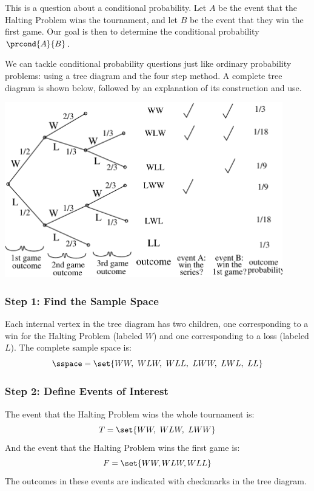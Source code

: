 This is a question about a conditional probability.  Let $A$ be the
event that the Halting Problem wins the tournament, and let $B$ be the
event that they win the first game.  Our goal is then to determine the
conditional probability $\prcond{A}{B}$.

We can tackle conditional probability questions just like ordinary
probability problems: using a tree diagram and the four step method.
A complete tree diagram is shown below, followed by an explanation of
its construction and use.
%
\begin{center}
\includegraphics[height=3in]{figures/hockey} %
\end{center}

\subsubsection*{Step 1:  Find the Sample Space}

Each internal vertex in the tree diagram has two children, one
corresponding to a win for the Halting Problem (labeled $W$) and one
corresponding to a loss (labeled $L$).  The complete sample space is:
%
\[
\sspace = \set{ WW,\ WLW,\ WLL,\ LWW,\ LWL,\ LL }
\]

\subsubsection*{Step 2:  Define Events of Interest}

The event that the Halting Problem wins the whole tournament is:
%
\[
T = \set{WW,\ WLW,\ LWW} \\
\]
%
And the event that the Halting Problem wins the first game is:
%
\[
F = \set{WW, WLW, WLL }
\]
%
The outcomes in these events are indicated with checkmarks in the tree
diagram.


